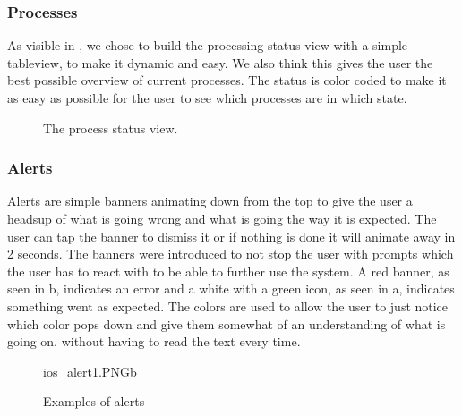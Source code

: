 \subsubsection{Processes}

As visible in , we chose to build the processing status view with a simple tableview, to make it dynamic and easy. We also think this gives the user the best possible overview of current processes. The status is color coded to make it as easy as possible for the user to see which processes are in which state.
\begin{figure}[h]
\caption{The process status view.}
\label{fig:ios_processingStatus}
\end{figure}
\FloatBarrier

\subsubsection{Alerts}
Alerts are simple banners animating down from the top to give the user a headsup of what is going wrong and what is going the way it is expected. The user can tap the banner to dismiss it or if nothing is done it will animate away in 2 seconds. The banners were introduced to not stop the user with prompts which the user has to react with to be able to further use the system. A red banner, as seen in b, indicates an error and a white with a green icon, as seen in a, indicates something went as expected. The colors are used to allow the user to just notice which color pops down and give them somewhat of an understanding of what is going on. without having to read the text every time.
\begin{figure}[h!]
		{ios_alert1.PNG}{b}
\caption{Examples of alerts}
\label{fig:ios_alerts}
\end{figure}
\FloatBarrier


